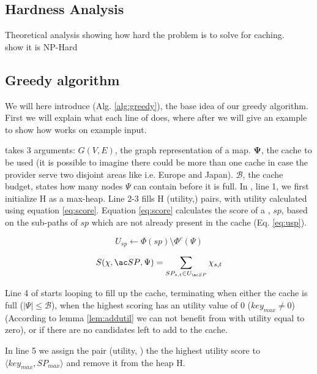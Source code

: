\subsection{Hardness Analysis}
Theoretical analysis showing how hard the problem is to solve for \spath caching.\\
show it is NP-Hard
 

\subsection{Greedy algorithm}
We will here introduce \salgo (Alg. \ref{alg:greedy}), the base idea of our greedy algorithm. First we will explain what each line of \salgo does, where after we will give an example to show how \salgo works on example input.

\salgo takes 3 arguments: $G(V,E)$, the graph representation of a map. $\mathbf{\Psi}$, the cache to be used (it is possible to imagine there could be more than one cache in case the \spath provider serve two disjoint areas like i.e. Europe and Japan). $\mathcal{B}$, the cache budget, states how many nodes $\Psi$ can contain before it is full.
In \salgons, line 1, we first initialize H as a max-heap. Line 2-3 fills H (utility,\spath) pairs, with utility calculated using equation \ref{eq:score}. 
Equation \ref{eq:score} calculates the score of a \spathns, $sp$, based on the sub-paths of $sp$ which are not already present in the cache (Eq. \ref{eq:usp}).

\begin{equation} \label{eq:usp}
U_{sp} \leftarrow \Phi(sp) \setminus \Phi^c(\Psi)
\end{equation}

\begin{equation} \label{eq:score}
S(\chi, \spath, \Psi) = \sum\limits_{SP_{s,t} \in U_{\spath}} \chi_{s,t}
\end{equation}


Line 4 of \salgo starts looping to fill up the cache, terminating when either the cache is full ($| \Psi | \leq  \mathcal{B}$), when the highest scoring \spath has an utility value of 0 ($key_{max} \neq 0$) (According to lemma \ref{lem:addutil} we can not benefit from \spaths with utility equal to zero), or if there are no \spath candidates left to add to the cache.

In line 5 we assign the pair (utility, \spath) the the highest utility score to $\langle  key_{max},  SP_{max} \rangle$ and remove it from the heap H.

